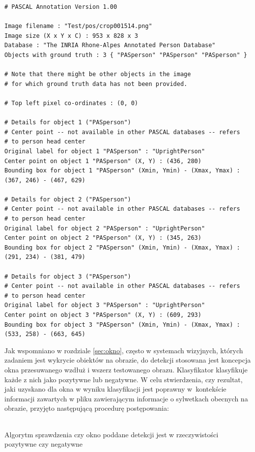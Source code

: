 \begin{lstlisting}
# PASCAL Annotation Version 1.00

Image filename : "Test/pos/crop001514.png"
Image size (X x Y x C) : 953 x 828 x 3
Database : "The INRIA Rhone-Alpes Annotated Person Database"
Objects with ground truth : 3 { "PASperson" "PASperson" "PASperson" }

# Note that there might be other objects in the image
# for which ground truth data has not been provided.

# Top left pixel co-ordinates : (0, 0)

# Details for object 1 ("PASperson")
# Center point -- not available in other PASCAL databases -- refers
# to person head center
Original label for object 1 "PASperson" : "UprightPerson"
Center point on object 1 "PASperson" (X, Y) : (436, 280)
Bounding box for object 1 "PASperson" (Xmin, Ymin) - (Xmax, Ymax) : (367, 246) - (467, 629)

# Details for object 2 ("PASperson")
# Center point -- not available in other PASCAL databases -- refers
# to person head center
Original label for object 2 "PASperson" : "UprightPerson"
Center point on object 2 "PASperson" (X, Y) : (345, 263)
Bounding box for object 2 "PASperson" (Xmin, Ymin) - (Xmax, Ymax) : (291, 234) - (381, 479)

# Details for object 3 ("PASperson")
# Center point -- not available in other PASCAL databases -- refers
# to person head center
Original label for object 3 "PASperson" : "UprightPerson"
Center point on object 3 "PASperson" (X, Y) : (609, 293)
Bounding box for object 3 "PASperson" (Xmin, Ymin) - (Xmax, Ymax) : (533, 258) - (663, 645)
\end{lstlisting}

Jak wspomniano w rozdziale \ref{sec:okno}, często w systemach
wizyjnych, których zadaniem jest wykrycie obiektów na obrazie, do detekcji stosowana jest koncepcja okna przesuwanego wzdłuż i wszerz testowanego obrazu. Klasyfikator klasyfikuje każde z nich
jako pozytywne lub negatywne. W celu stwierdzenia, czy rezultat, jaki uzyskano dla
okna w wyniku klasyfikacji jest poprawny w~kontekście
informacji zawartych w pliku zawierającym informacje o sylwetkach
obecnych na obrazie, przyjęto następującą procedurę postępowania:

\begin{algorithm}[H]
 \SetAlgoLined
  {
 	 {
 		 {
 			\;
 		}
 	}
 }
 \\
 \caption{Algorytm sprawdzenia czy okno poddane detekcji jest w rzeczywistości pozytywne czy negatywne}
\end{algorithm}


